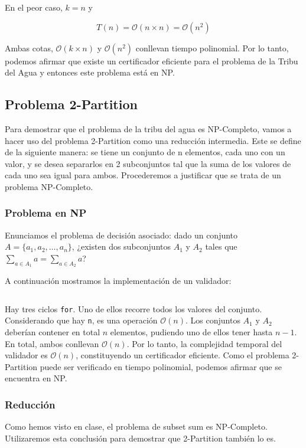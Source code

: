 \documentclass{article}
\begin{document}
En el peor caso, $k = n$ y

$$
T(n) = \mathcal{O}(n \times n) = \mathcal{O}(n^2)
$$

Ambas cotas, $\mathcal{O}(k \times n)$ y $\mathcal{O}(n^2)$ conllevan tiempo polinomial. Por lo tanto, podemos afirmar que existe un certificador eficiente para el problema de la Tribu del Agua y entonces este problema está en NP.

\subsection{Problema 2-Partition}
\label{subsec:partition}

Para demostrar que el problema de la tribu del agua es NP-Completo, vamos a hacer uso del problema 2-Partition como una reducción intermedia. Este se define de la siguiente manera: se tiene un conjunto de n elementos, cada uno con un valor, y se desea separarlos en 2 subconjuntos tal que la suma de los valores de cada uno sea igual para ambos. Procederemos a justificar que se trata de un problema NP-Completo.

\subsubsection{Problema en NP}
Enunciamos el problema de decisión asociado: dado un conjunto \( A =\{a_1, a_2, \ldots, a_n\} \), ¿existen dos subconjuntos \( A_1 \) y \( A_2 \) tales que \( \sum_{a \in A_1} a = \sum_{a \in A_2} a \)?

A continuación mostramos la implementación de un validador:
\inputminted[linenos]{python}{codigo/certificador_2_partition.py}

Hay tres ciclos \texttt{for}. Uno de ellos recorre todos los valores del conjunto. Considerando que hay \texttt{n}, es una operación $\mathcal{O}(n)$. Los conjuntos $A_1$ y $A_2$ deberían contener en total $n$ elementos, pudiendo uno de ellos tener hasta  $n-1$. En total, ambos conllevan $\mathcal{O}(n)$. Por lo tanto, la complejidad temporal del validador es $\mathcal{O}(n)$, constituyendo un certificador eficiente. Como el problema 2-Partition puede ser verificado en tiempo polinomial, podemos afirmar que se encuentra en NP.

\subsubsection{Reducción}
\label{sec:np-completo-2p}

Como hemos visto en clase, el problema de subset sum es NP-Completo. Utilizaremos esta conclusión para demostrar que 2-Partition también lo es.
\end{document}
